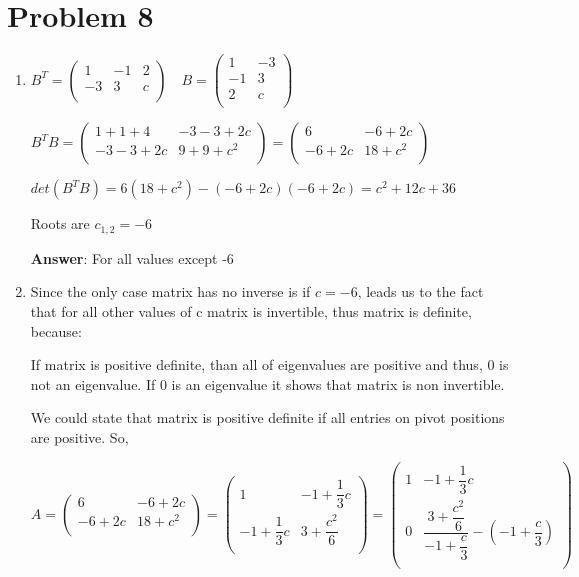 \documentclass[12pt,letterpaper]{article}
\begin{document}
\section*{Problem 8}
    \begin{enumerate}[label=(\alph*)]
        \item
        $B^T = \begin{pmatrix}
            1 & -1 & 2 \\
            -3 & 3 & c \\
        \end{pmatrix}\quad B = \begin{pmatrix}
            1 & -3 \\
            -1 & 3 \\
            2 & c \\
        \end{pmatrix}$
        
        $B^TB = \begin{pmatrix}
            1+1+4 & -3-3+2c \\
            -3-3+2c & 9+9+c^2 \\
        \end{pmatrix} = \begin{pmatrix}
            6 & -6+2c \\
            -6+2c & 18+c^2 \\
        \end{pmatrix}$
        
        $det(B^TB) = 6(18 + c^2) - (-6 + 2c)(-6 + 2c) = c^2 + 12c + 36$
        
        Roots are $c_{1,2} = -6$
        
        \textbf{Answer}: For all values except -6
        \item
        Since the only case matrix has no inverse is if $c = -6$, leads us to the fact that for all other values of c matrix is invertible, thus matrix is definite, because:
        
        If matrix is positive definite, than all of eigenvalues are positive and thus, 0 is not an eigenvalue. If 0 is an eigenvalue it shows that matrix is non invertible.
        
        We could state that matrix is positive definite if all entries on pivot positions are positive. So,
        
        $A = \begin{pmatrix}
            6 & -6+2c \\
            -6+2c & 18+c^2 \\
        \end{pmatrix} = \begin{pmatrix}
            1 & -1+\dfrac{1}{3}c \\
            -1+\dfrac{1}{3}c & 3+\dfrac{c^2}{6} \\
        \end{pmatrix} = \begin{pmatrix}
            1 & -1+\dfrac{1}{3}c \\
            0 & \dfrac{3+\dfrac{c^2}{6}}{-1 + \dfrac{c}{3}} - (-1 + \dfrac{c}{3}) \\
        \end{pmatrix}$
        

\end{enumerate}
\end{document}
